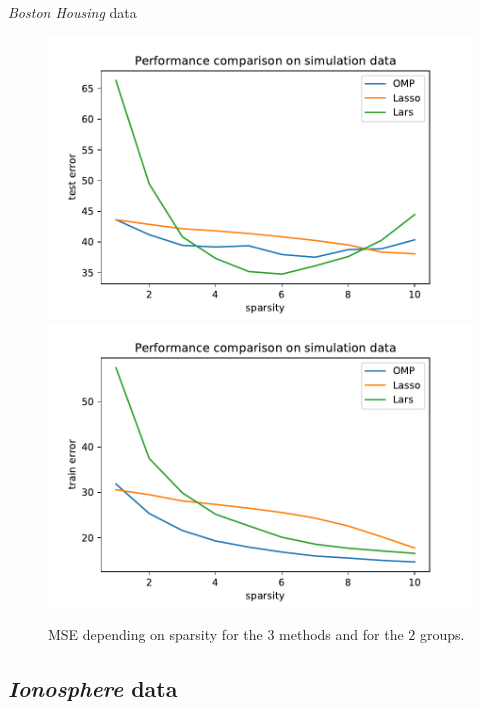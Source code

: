 \documentclass[unknownkeysallowed]{beamer}
\begin{document}
\begin{frame}{\textit{Boston Housing} data}
\begin{figure}
    \centering
    \includegraphics[scale=0.35]{./images/test_error_housing.pdf}
    \includegraphics[scale=0.35]{./images/training_error_housing.pdf}
    \caption{MSE depending on sparsity for the $3$ methods and for the $2$ groups.}
\end{figure}
\end{frame}

\subsection{\textit{Ionosphere} data}
\label{sub:Ionosphere data}
\end{document}
